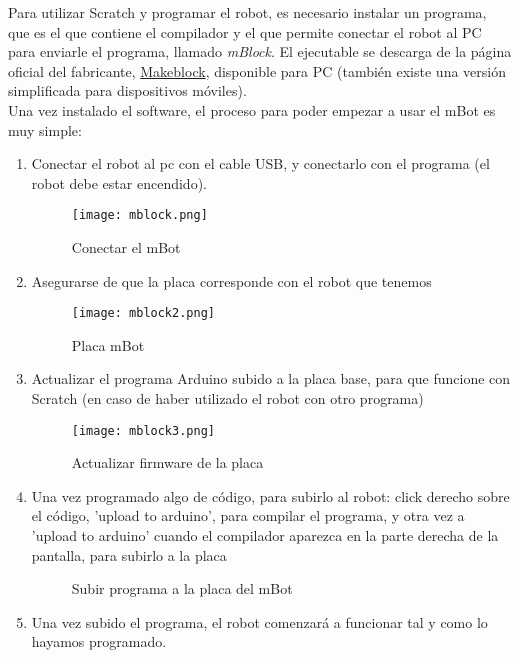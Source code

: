 Para utilizar Scratch y programar el robot, es necesario instalar un programa, que es el que contiene el compilador y el que permite conectar el robot al PC para enviarle el programa, llamado \textit{mBlock}. El ejecutable se descarga de la página oficial del fabricante, \href{https://www.makeblock.es/blog/descargas/}{Makeblock}, disponible para PC (también existe una versión simplificada para dispositivos móviles).\\
Una vez instalado el software, el proceso para poder empezar a usar el mBot es muy simple:
\begin{enumerate}\label{list:conexionMblock}
	\item Conectar el robot al pc con el cable USB, y conectarlo con el programa (el robot debe estar encendido).
	\begin{figure}[H]
		\texttt{[image: mblock.png]}
		\centering
		\label{img:mblock}
		\caption{Conectar el mBot}
	\end{figure}

	\item  Asegurarse de que la placa corresponde con el robot que tenemos
	\begin{figure}[H]
		\texttt{[image: mblock2.png]}
		\centering
		\label{img:mblock2}
		\caption{Placa mBot}
	\end{figure}

	\item Actualizar el programa Arduino subido a la placa base, para que funcione con Scratch (en caso de haber utilizado el robot con otro programa)
	\begin{figure}[H]
		\texttt{[image: mblock3.png]}
		\centering
		\label{img:mblock3}
		\caption{Actualizar firmware de la placa}
	\end{figure}

	\item Una vez programado algo de código, para subirlo al robot: click derecho sobre el código, 'upload to arduino', para compilar el programa, y otra vez a 'upload to arduino' cuando el compilador aparezca en la parte derecha de la pantalla, para subirlo a la placa
	\begin{figure}[H]
		\centering
		\begin{subfigure}
			[Compilar programa]{
				\texttt{[image: mblock4.png]}
				\label{img:uploadArduino1}}
		\end{subfigure}
		\begin{subfigure}
			[Subir programa a la placa]{
				\texttt{[image: mblock5.png]}
				\label{img:uploadArduino2}}
		\end{subfigure}
	\label{img:uploadArduino}
	\caption{Subir programa a la placa del mBot}
	\end{figure}

	\item Una vez subido el programa, el robot comenzará a funcionar tal y como lo hayamos programado.
\end{enumerate}
 

